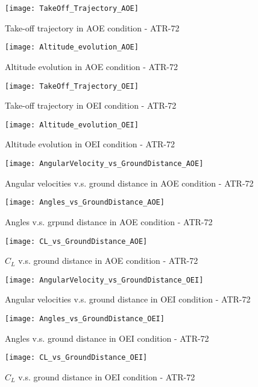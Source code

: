 %
\clearpage
%
\begin{figure}[H]
\centering
\texttt{[image: TakeOff\_Trajectory\_AOE]}
\caption{Take-off trajectory in AOE condition - ATR-72}
\end{figure}
%
\begin{figure}[H]
\centering
\texttt{[image: Altitude\_evolution\_AOE]}
\caption{Altitude evolution in AOE condition - ATR-72}
\end{figure}
%
\begin{figure}[H]
\centering
\texttt{[image: TakeOff\_Trajectory\_OEI]}
\caption{Take-off trajectory in OEI condition - ATR-72}
\end{figure}
%
\begin{figure}[H]
\centering
\texttt{[image: Altitude\_evolution\_OEI]}
\caption{Altitude evolution in OEI condition - ATR-72}
\end{figure}
%
\begin{figure}[H]
\centering
\texttt{[image: AngularVelocity\_vs\_GroundDistance\_AOE]}
\caption{Angular velocities v.s. ground distance in AOE condition - ATR-72}
\end{figure}
%
\begin{figure}[H]
\centering
\texttt{[image: Angles\_vs\_GroundDistance\_AOE]}
\caption{Angles v.s. grpund distance in AOE condition - ATR-72}
\end{figure}
%
\begin{figure}[H]
\centering
\texttt{[image: CL\_vs\_GroundDistance\_AOE]}
\caption{$C_L$ v.s. ground distance in AOE condition - ATR-72}
\end{figure}
%
\begin{figure}[H]
\centering
\texttt{[image: AngularVelocity\_vs\_GroundDistance\_OEI]}
\caption{Angular velocities v.s. ground distance in OEI condition - ATR-72}
\end{figure}
%
\begin{figure}[H]
\centering
\texttt{[image: Angles\_vs\_GroundDistance\_OEI]}
\caption{Angles v.s. ground distance in OEI condition - ATR-72}
\end{figure}
%
\begin{figure}[H]
\centering
\texttt{[image: CL\_vs\_GroundDistance\_OEI]}
\caption{$C_L$ v.s. ground distance in OEI condition - ATR-72}
\end{figure}

